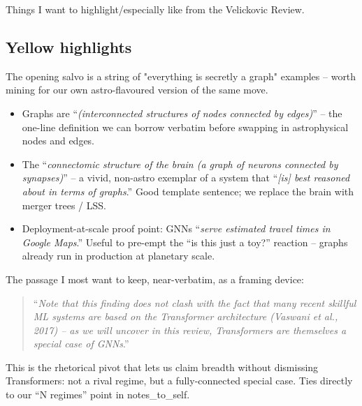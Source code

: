 Things I want to highlight/especially like from the Velickovic Review.


\subsection*{Yellow highlights}

The opening salvo is a string of "everything is secretly a graph" examples --
worth mining for our own astro-flavoured version of the same move.

\begin{itemize}
    \item Graphs are ``\emph{(interconnected structures of nodes connected by
        edges)}'' -- the one-line definition we can borrow verbatim before
        swapping in astrophysical nodes and edges.
    \item The ``\emph{connectomic structure of the brain (a graph of neurons
        connected by synapses)}'' -- a vivid, non-astro exemplar of a system
        that ``\emph{[is] best reasoned about in terms of graphs}.'' Good
        template sentence; we replace the brain with merger trees / LSS.
    \item Deployment-at-scale proof point: GNNs ``\emph{serve estimated travel
        times in Google Maps}.'' Useful to pre-empt the ``is this just a toy?''
        reaction -- graphs already run in production at planetary scale.
\end{itemize}

The passage I most want to keep, near-verbatim, as a framing device:
\begin{quote}
``\emph{Note that this finding does not clash with the fact that many recent
skillful ML systems are based on the Transformer architecture (Vaswani et al.,
2017) -- as we will uncover in this review, Transformers are themselves a
special case of GNNs}.''
\end{quote}
This is the rhetorical pivot that lets us claim breadth without dismissing
Transformers: not a rival regime, but a fully-connected special case. Ties
directly to our ``N regimes'' point in notes\_to\_self.

